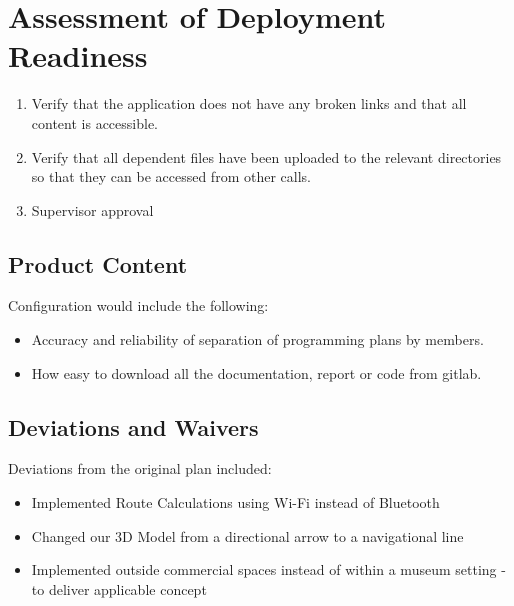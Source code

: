 \section{Assessment of Deployment Readiness}
\begin{enumerate}
    \item Verify that the application does not have any broken links and that all content is accessible.
    \item Verify that all dependent files have been uploaded to the relevant directories so that they can be accessed from other calls.
    \item Supervisor approval
\end{enumerate}
\subsection{Product Content}
Configuration would include the following:
\begin{itemize}
    \item Accuracy and reliability of separation of programming plans by members.
    \item How easy to download all the documentation, report or code from gitlab.
\end{itemize}
\subsection{Deviations and Waivers}
Deviations from the original plan included:
\begin{itemize}
    \item Implemented Route Calculations using Wi-Fi instead of Bluetooth
    \item Changed our 3D Model from a directional arrow to a navigational line
    \item Implemented outside commercial spaces instead of within a museum setting - to deliver applicable concept
\end{itemize}


